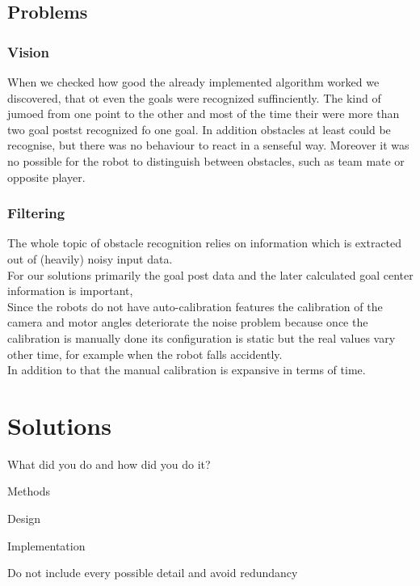 \documentclass[lnicst,a4paper]{svmultln}
\begin{document}

\subsection{Problems}

\subsubsection{Vision}
When we checked how good the already implemented algorithm worked we discovered, that ot even the goals were recognized suffinciently. The kind of jumoed from one point to the other and most of the time their were more than two goal postst recognized fo one goal. In addition obstacles at least could be recognise, but there was no behaviour to react in a senseful way. Moreover it was no possible for the robot to distinguish between obstacles, such as team mate or opposite player.

\subsubsection{Filtering}
The whole topic of obstacle recognition relies on information which is extracted out of (heavily) noisy input data.
\\
For our solutions primarily the goal post data and the later calculated goal center information is important, 
\\
Since the robots do not have auto-calibration features the calibration of the camera and motor angles deteriorate the noise problem because once the calibration is manually done its configuration is static but the real values vary other time, for example when the robot falls accidently.
\\
In addition to that the manual calibration is expansive in terms of time.





\section{Solutions}
What did you do and how did you do it?

Methods

Design

Implementation

Do not include every possible detail and avoid redundancy
\end{document}
